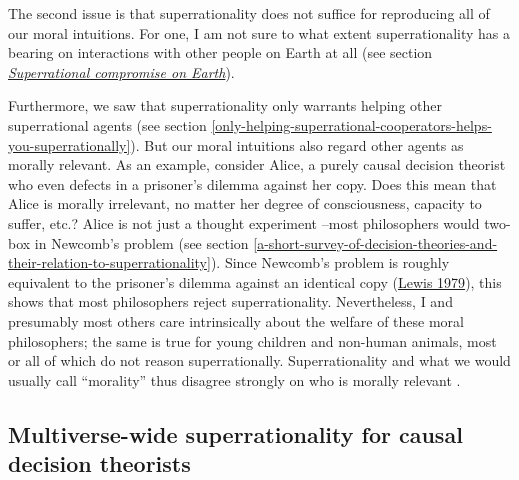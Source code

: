 The second issue is that superrationality does not suffice for
reproducing all of our moral intuitions. For one, I am not sure to what
extent superrationality has a bearing on interactions with other people
on Earth at all (see section
\protect\hyperlink{_hbp3s2xblhpq}{\emph{Superrational compromise on
Earth}}).

Furthermore, we saw that superrationality only warrants helping other
superrational agents (see section
\ref{only-helping-superrational-cooperators-helps-you-superrationally}). But
our moral intuitions also regard other agents as morally relevant. As an
example, consider Alice, a purely causal decision theorist who even
defects in a prisoner's dilemma against her copy. Does this mean that
Alice is morally irrelevant, no matter her degree of consciousness,
capacity to suffer, etc.? Alice is not just a thought experiment --most
philosophers would two-box in Newcomb's problem (see section
\ref{a-short-survey-of-decision-theories-and-their-relation-to-superrationality}). Since Newcomb's problem is roughly equivalent to
the prisoner's dilemma against an identical copy
(\href{https://sl4librarian.files.wordpress.com/2017/01/lewis-prisoners-dilemma-newcomb-problem.pdf}{Lewis
1979}), this shows that most philosophers reject superrationality.
Nevertheless, I and presumably most others care intrinsically about the
welfare of these moral philosophers; the same is true for young children
and non-human animals, most or all of which do not reason
superrationally. Superrationality and what we would usually call
``morality'' thus disagree strongly on who is morally relevant
\parencite{Drescher2006-ky}.

\hypertarget{multiverse-wide-superrationality-for-causal-decision-theorists}{\subsection{Multiverse-wide
superrationality for causal decision
theorists}\label{multiverse-wide-superrationality-for-causal-decision-theorists}}

